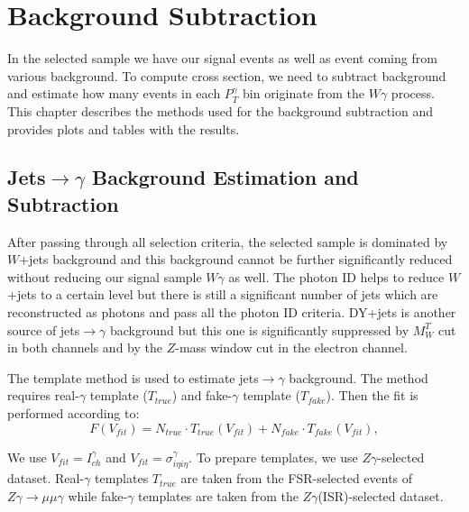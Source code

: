 \section{Background Subtraction}
\label{sec:BackgroundSubtraction}

In the selected sample we have our signal events as well as event coming from various background. To compute cross section, we need to subtract background and estimate how many events in each $P_T^\gamma$ bin originate from the $W\gamma$ process. This chapter describes the methods used for the background subtraction and provides plots and tables with the results.

\subsection{Jets$\rightarrow\gamma$ Background Estimation and Subtraction}
\label{sec:BackgroundSubtraction_jtog}

After passing through all selection criteria, the selected sample is dominated by $W$+jets background and this background cannot be further significantly reduced without reducing our signal sample $W\gamma$ as well. The photon ID helps to reduce $W$+jets to a certain level but there is still a significant number of jets which are reconstructed as photons and pass all the photon ID criteria. DY+jets is another source of jets$\rightarrow \gamma$ background but this one is significantly suppressed by $M_W^T$ cut in both channels and by the $Z$-mass window cut in the electron channel.

The template method is used to estimate jets$ \rightarrow \gamma$ background. The method requires real-$\gamma$ template ($T_{true}$) and fake-$\gamma$ template ($T_{fake}$). Then the fit is performed according to: 
\begin{equation}
F(V_{fit})=N_{true} \cdot T_{true}(V_{fit}) + N_{fake} \cdot T_{fake}(V_{fit}),
\end{equation}

We use $V_{fit}=I_{ch}^{\gamma}$ and $V_{fit}=\sigma_{i\eta i\eta}^{\gamma}$. To prepare templates, we use $Z\gamma$-selected dataset. Real-$\gamma$ templates $T_{true}$ are taken from the FSR-selected events of $Z\gamma\rightarrow\mu\mu\gamma$ while fake-$\gamma$ templates are taken from the $Z\gamma$(ISR)-selected dataset.

